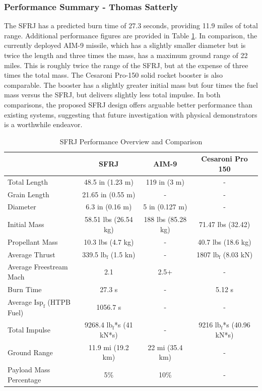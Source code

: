\subsubsection{Performance Summary - Thomas Satterly}

The SFRJ has a predicted burn time of 27.3 seconds, providing 11.9 miles of total range. Additional performance figures are provided in Table \ref{tab:PerformanceOveriew}. In comparison, the currently deployed AIM-9 missile, which has a slightly smaller diameter but is twice the length and three times the mass, has a maximum ground range of 22 miles. This is roughly twice the range of the SFRJ, but at the expense of three times the total mass. The Cesaroni Pro-150 solid rocket booster is also comparable. The booster has a slightly greater initial mass but four times the fuel mass versus the SFRJ, but delivers slightly less total impulse. In both comparisons, the proposed SFRJ design offers arguable better performance than existing systems, suggesting that future investigation with physical demonstrators is a worthwhile endeavor. 

\begin{table}[H]
\centering
\caption{SFRJ Performance Overview and Comparison}
\label{tab:PerformanceOveriew}
\begin{tabular}{l|c|c|c}
& \textbf{SFRJ} & \textbf{AIM-9} & \textbf{Cesaroni Pro 150}\\
\hline
Total Length & 48.5 in (1.23 m) & 119 in (3 m) & - \\
Grain Length & 21.65 in (0.55 m) & - & - \\
Diameter & 6.3 in (0.16 m) & 5 in (0.127 m) & - \\
Initial Mass & 58.51 lbs (26.54 kg) & 188 lbs (85.28 kg) & 71.47 lbs (32.42)\\
Propellant Mass & 10.3 lbs (4.7 kg) & - & 40.7 lbs (18.6 kg) \\
Average Thrust & 339.5 $\text{lb}_{\text{f}}$ (1.5 kn) & - & 1807 $\text{lb}_{\text{f}}$ (8.03 kN) \\
Average Freestream Mach & 2.1 & 2.5+ & - \\
Burn Time & 27.3 s & - & 5.12 s\\
Average $\text{Isp}_{\text{f}}$ (HTPB Fuel) & 1056.7 s & - & - \\
Total Impulse & 9268.4 $\text{lb}_{\text{f}}$*s (41 kN*s) & - & 9216 $\text{lb}_{\text{f}}$*s (40.96 kN*s)\\
Ground Range & 11.9 mi (19.2 km) & 22 mi (35.4 km) & - \\
Payload Mass Percentage & 5\% & 10\% & -
\end{tabular}
\end{table}